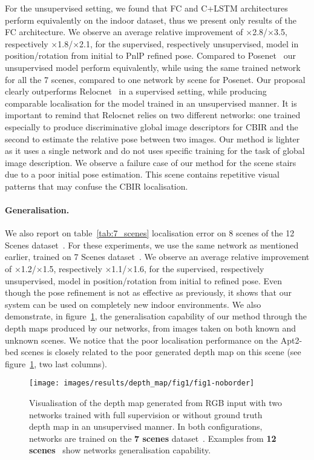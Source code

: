 For the unsupervised setting, we found that FC and C+LSTM architectures perform equivalently on the indoor dataset, thus we present only results of the FC architecture. We observe an average relative improvement of $\times$2.8/$\times$3.5, respectively $\times$1.8/$\times$2.1, for the supervised, respectively unsupervised, model in position/rotation from initial to PnlP refined pose. Compared to Posenet~\citep{Kendall2017} our unsupervised model perform equivalently, while using the same trained network for all the 7 scenes, compared to one network by scene for Posenet. Our proposal clearly outperforms Relocnet~\citep{Balntas2018} in a supervised setting, while producing comparable localisation for the model trained in an unsupervised manner. It is important to remind that Relocnet relies on two different networks: one trained especially to produce discriminative global image descriptors for CBIR and the second to estimate the relative pose between two images. Our method is lighter as it uses a single network and do not uses specific training for the task of global image description. We observe a failure case of our method for the scene stairs due to a poor initial pose estimation. This scene contains repetitive visual patterns that may confuse the CBIR localisation.

\paragraph{Generalisation.} We also report on table~\ref{tab:7_scenes} localisation error on 8 scenes of the 12 Scenes dataset~\citep{Valentin2016}. For these experiments, we use the same network as mentioned earlier, trained on 7 Scenes dataset~\citep{Shotton2013}. We observe an average relative improvement of $\times$1.2/$\times$1.5, respectively $\times$1.1/$\times$1.6, for the supervised, respectively unsupervised, model in position/rotation from initial to refined pose. Even though the pose refinement is not as effective as previously, it shows that our system can be used on completely new indoor environments. We also demonstrate, in figure~\ref{fig:depth_map_indoor}, the generalisation capability of our method through the depth maps produced by our networks, from images taken on both known and unknown scenes. We notice that the poor localisation performance on the Apt2-bed scenes is closely related to the poor generated depth map on this scene (see figure~\ref{fig:depth_map_indoor}, two last columns).

\begin{figure}[t]
    \centering
	\texttt{[image: images/results/depth\_map/fig1/fig1-noborder]}
	\caption{\label{fig:depth_map_indoor} Visualisation of the depth map generated from RGB input with two networks trained with full supervision or without ground truth depth map in an unsupervised manner. In both configurations, networks are trained on the \textbf{7 scenes} dataset~\citep{Shotton2013}. Examples from \textbf{12 scenes}~\citep{Valentin2016} show networks generalisation capability.}
\end{figure}

